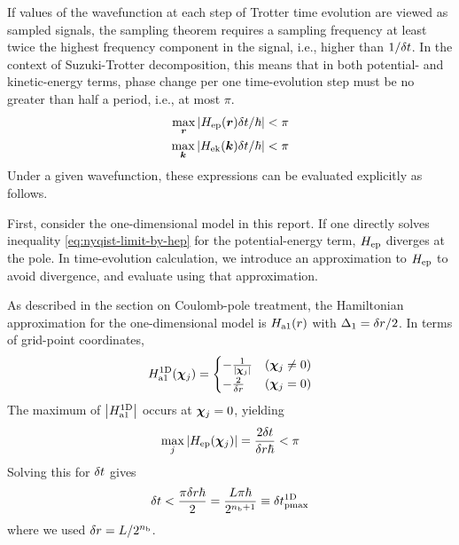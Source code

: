 \documentclass[a4paper,11pt]{article}
\begin{document}
If values of the wavefunction at each step of Trotter time evolution are viewed
as sampled signals, the sampling theorem requires a sampling frequency at least
twice the highest frequency component in the signal, i.e., higher than
$1/\delta t$. In the context of Suzuki-Trotter decomposition, this means that in
both potential- and kinetic-energy terms, phase change per one time-evolution
step must be no greater than half a period, i.e., at most $\pi$.
\begin{align}
\max_{\bm{r}}{\left| H_{\mathrm{ep}}(\bm{r})\delta t/\hbar \right|} < \pi \label{eq:nyqist-limit-by-hep}\\
\max_{\bm{k}}{\left| H_{\mathrm{ek}}(\bm{k})\delta t/\hbar \right|} < \pi \label{eq:nyqist-limit-by-hek}
\end{align}
Under a given wavefunction, these expressions can be evaluated explicitly as
follows.

First, consider the one-dimensional model in this report. If one directly solves
inequality \ref{eq:nyqist-limit-by-hep} for the potential-energy term,
$H_{\mathrm{ep}}$ diverges at the pole. In time-evolution calculation, we introduce an
approximation to $H_{\mathrm{ep}}$ to avoid divergence, and evaluate using that
approximation.

As described in the section on Coulomb-pole treatment, the Hamiltonian
approximation for the one-dimensional model is $H_{\mathrm{a1}}(r)$ with
$\Delta_1=\delta r/2$. In terms of grid-point coordinates,
\begin{equation}
H_{\mathrm{a1}}^{\mathrm{1D}}(\bm{\chi}_{j}) = \begin{cases}
-\frac{1}{{\left| \bm{\chi}_{j} \right|}} & (\bm{\chi}_{j}\neq0) \\
-\frac{2}{\delta r} & (\bm{\chi}_{j}=0)
\end{cases}
\end{equation}
The maximum of ${\left| H_{\mathrm{a1}}^{\mathrm{1D}} \right|}$ occurs at $\bm{\chi}_{j}=0$, yielding
\begin{equation}
\max_{j}{\left| H_{\mathrm{ep}}(\bm{\chi}_{j}) \right|} = \frac{2\delta t}{\delta r\hbar}<\pi
\end{equation}
Solving this for $\delta t$ gives
\begin{equation}
\delta t < \frac{\pi\delta r\hbar}{2}=\frac{L\pi\hbar}{2^{n_{\mathrm{b}}+1}}\equiv\delta t_{\mathrm{pmax}}^{\mathrm{1D}}
 \label{eq:nyqist-limit-by-hep-final}
\end{equation}
where we used $\delta r=L/2^{n_{\mathrm{b}}}$.
\end{document}
